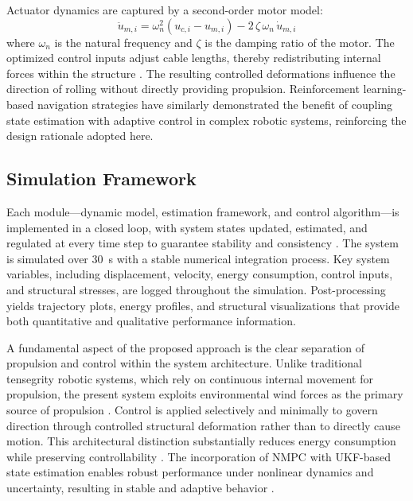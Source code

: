 \documentclass[conference]{IEEEtran}
\begin{document}
Actuator dynamics are captured by a second-order motor model:
%
\begin{equation}
\label{eq:motor}
\ddot{u}_{m,i} = \omega_n^2 \left( u_{c,i} - u_{m,i} \right)
               - 2\,\zeta\,\omega_n\,\dot{u}_{m,i}
\end{equation}
%
where $\omega_n$ is the natural frequency and $\zeta$ is the damping ratio of
the motor. The optimized control inputs adjust cable lengths, thereby
redistributing internal forces within the structure \cite{b8}. The resulting
controlled deformations influence the direction of rolling without directly
providing propulsion. Reinforcement learning-based navigation strategies
\cite{b20} have similarly demonstrated the benefit of coupling state
estimation with adaptive control in complex robotic systems, reinforcing the
design rationale adopted here.

\subsection{Simulation Framework}
Each module---dynamic model, estimation framework, and control algorithm---is
implemented in a closed loop, with system states updated, estimated, and
regulated at every time step to guarantee stability and consistency \cite{b9}.
The system is simulated over 30~s with a stable numerical integration process.
Key system variables, including displacement, velocity, energy consumption,
control inputs, and structural stresses, are logged throughout the simulation.
Post-processing yields trajectory plots, energy profiles, and structural
visualizations that provide both quantitative and qualitative performance
information.

A fundamental aspect of the proposed approach is the clear separation of
propulsion and control within the system architecture. Unlike traditional
tensegrity robotic systems, which rely on continuous internal movement for
propulsion, the present system exploits environmental wind forces as the
primary source of propulsion \cite{b11,b12}. Control is applied selectively
and minimally to govern direction through controlled structural deformation
rather than to directly cause motion. This architectural distinction
substantially reduces energy consumption while preserving controllability
\cite{b19}. The incorporation of NMPC with UKF-based state estimation enables
robust performance under nonlinear dynamics and uncertainty, resulting in
stable and adaptive behavior \cite{b6,b10}.
\end{document}
